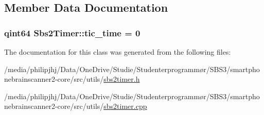 \subsection{Member Data Documentation}
\hypertarget{classSbs2Timer_acd1e0853bb3a6e0477f86d5f00546c9a}{
\subsubsection[{tic\-\_\-time}]{\setlength{\rightskip}{0pt plus 5cm}qint64 Sbs2\-Timer\-::tic\-\_\-time = 0\hspace{0.3cm}{\ttfamily [static]}}}\label{classSbs2Timer_acd1e0853bb3a6e0477f86d5f00546c9a}


The documentation for this class was generated from the following files\-:\begin{DoxyCompactItemize}
\item 
/media/philipjhj/\-Data/\-One\-Drive/\-Studie/\-Studenterprogrammør/\-S\-B\-S3/smartphonebrainscanner2-\/core/src/utils/\hyperlink{sbs2timer_8h}{sbs2timer.\-h}\item 
/media/philipjhj/\-Data/\-One\-Drive/\-Studie/\-Studenterprogrammør/\-S\-B\-S3/smartphonebrainscanner2-\/core/src/utils/\hyperlink{sbs2timer_8cpp}{sbs2timer.\-cpp}\end{DoxyCompactItemize}
